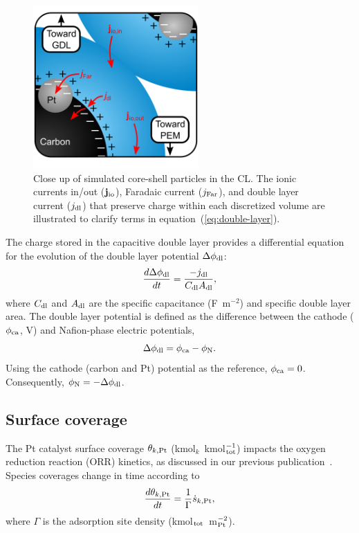 \documentclass[final,3p,times,twocolumn]{elsarticle}    %
\begin{document}
\begin{figure}[!t]
    \centering
    \includegraphics[width=2.487in]{figures/double-layer-2_487in.png}
    \caption{Close up of simulated core-shell particles in the CL. The ionic currents in/out (${\bf j}_{\rm io}$), Faradaic current ($j_{\rm Far}$), and double layer current ($j_{\rm dl}$) that preserve charge within each discretized volume are illustrated to clarify terms in equation~(\ref{eq:double-layer}).}
    \label{fig:double-layer}
\end{figure}

The charge stored in the capacitive double layer provides a differential equation for the evolution of the double layer potential $\Delta\phi_{\rm dl}$:
\begin{equation}
    \frac{d \Delta\phi_{\rm dl}}{d t} = \frac{-j_{\rm dl}}{C_{\rm dl} A_{\rm dl}},
\end{equation}
where $C_{\rm dl}$ and $A_{\rm dl}$ are the specific capacitance (F~m$^{-2}$) and specific double layer area. The double layer potential is defined as the difference between the cathode ($\phi_{\rm ca}$, V) and Nafion-phase electric potentials,
\begin{equation}
    \Delta\phi_{\rm dl} = \phi_{\rm ca} - \phi_{\rm N}.
\end{equation}
Using the cathode (carbon and Pt) potential as the reference, $\phi_{\rm ca} = 0$. Consequently, $\phi_{\rm N} = -\Delta \phi_{\rm dl}$.

\subsection{Surface coverage}
The Pt catalyst surface coverage $\theta_{k, \rm Pt}$ (kmol$_k$~kmol$^{-1}_{\rm tot}$) impacts the oxygen reduction reaction (ORR) kinetics, as discussed in our previous publication~\cite{bib:randall_2020}. Species coverages change in time according to
\begin{equation}
    \frac{d \theta_{k, \rm Pt}}{d t} = \frac{1}{\Gamma} \dot{s}_{k, \rm Pt},
\end{equation}
where $\Gamma$ is the adsorption site density (kmol$_{\rm tot}$~m$^{-2}_{\rm Pt}$). 
\end{document}
